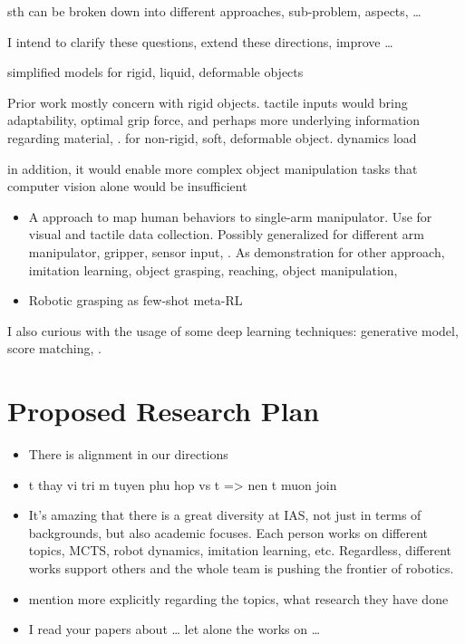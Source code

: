sth can be broken down into different approaches, sub-problem, aspects, \dots

I intend to clarify these questions, extend these directions, improve \dots

simplified models for rigid, liquid, deformable objects

Prior work mostly concern with rigid objects.
tactile inputs would bring adaptability, optimal grip force, and perhaps more underlying information regarding material, \etc. for non-rigid, soft, deformable object. dynamics load

in addition, it would enable more complex object manipulation tasks that computer vision alone would be insufficient

\begin{itemize}
	\item A approach to map human behaviors to single-arm manipulator. Use for visual and tactile data collection. Possibly generalized for different arm manipulator, gripper, sensor input, \etc. As demonstration for other approach, imitation learning, object grasping, reaching, object manipulation, \etc
	\item Robotic grasping as few-shot meta-\ac{RL}
\end{itemize}

I also curious with the usage of some deep learning techniques: generative model, score matching, \etc.

\section{Proposed Research Plan}

\todo{}

\begin{itemize}
	\item There is alignment in our directions
	\item t thay vi tri m tuyen phu hop vs t => nen t muon join
	\item It’s amazing that there is a great diversity at IAS, not just in terms of backgrounds, but also academic focuses. Each person works on different topics, MCTS, robot dynamics, imitation learning, etc. Regardless, different works support others and the whole team is pushing the frontier of robotics.
\end{itemize}

\begin{itemize}
	\item mention more explicitly regarding the topics, what research they have done
	\item I read your papers about … let alone the works on …
\end{itemize}
